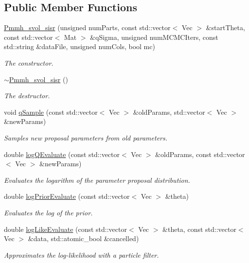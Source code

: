 \subsection*{Public Member Functions}
\begin{DoxyCompactItemize}
\item 
\hyperlink{classPmmh__svol__sisr_ad07ecbdfaccbb26ecefe2f6fd3e2338d}{Pmmh\+\_\+svol\+\_\+sisr} (unsigned num\+Parts, const std\+::vector$<$ Vec $>$ \&start\+Theta, const std\+::vector$<$ Mat $>$ \&q\+Sigma, unsigned num\+M\+C\+M\+C\+Iters, const std\+::string \&data\+File, unsigned num\+Cols, bool mc)
\begin{DoxyCompactList}\small\item\em The constructor. \end{DoxyCompactList}\item 
\hyperlink{classPmmh__svol__sisr_a7e0b043e751ab654c0e7dc25434a2f2a}{$\sim$\+Pmmh\+\_\+svol\+\_\+sisr} ()\hypertarget{classPmmh__svol__sisr_a7e0b043e751ab654c0e7dc25434a2f2a}{}\label{classPmmh__svol__sisr_a7e0b043e751ab654c0e7dc25434a2f2a}

\begin{DoxyCompactList}\small\item\em The destructor. \end{DoxyCompactList}\item 
void \hyperlink{classPmmh__svol__sisr_a18df26cb5c0bddefbd24866b1b4ff142}{q\+Sample} (const std\+::vector$<$ Vec $>$ \&old\+Params, std\+::vector$<$ Vec $>$ \&new\+Params)
\begin{DoxyCompactList}\small\item\em Samples new proposal parameters from old parameters. \end{DoxyCompactList}\item 
double \hyperlink{classPmmh__svol__sisr_a8164b385edb083df605ba766e000c12a}{log\+Q\+Evaluate} (const std\+::vector$<$ Vec $>$ \&old\+Params, const std\+::vector$<$ Vec $>$ \&new\+Params)
\begin{DoxyCompactList}\small\item\em Evaluates the logarithm of the parameter proposal distribution. \end{DoxyCompactList}\item 
double \hyperlink{classPmmh__svol__sisr_ab6c9983faf8ca460f8a8081c6a148aa2}{log\+Prior\+Evaluate} (const std\+::vector$<$ Vec $>$ \&theta)
\begin{DoxyCompactList}\small\item\em Evaluates the log of the prior. \end{DoxyCompactList}\item 
double \hyperlink{classPmmh__svol__sisr_af0bb463ef4d74e60022a4955f565390e}{log\+Like\+Evaluate} (const std\+::vector$<$ Vec $>$ \&theta, const std\+::vector$<$ Vec $>$ \&data, std\+::atomic\+\_\+bool \&cancelled)
\begin{DoxyCompactList}\small\item\em Approximates the log-\/likelihood with a particle filter. \end{DoxyCompactList}\end{DoxyCompactItemize}


